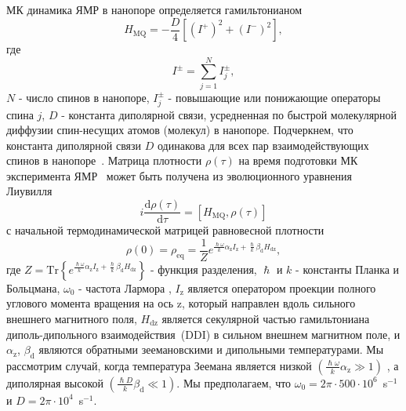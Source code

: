 \documentclass[review]{elsarticle}
\begin{document}
МК динамика ЯМР в нанопоре определяется гамильтонианом~\cite{Doronin_2019,Doronin_2009} 
%
\begin{equation}
    \label{eq:1}
    H_{\mathrm{MQ}} = - \dfrac{D}{4} \left[
        \left(I^{+}\right)^{2} 
        + \left(I^{-}\right)^{2} 
    \right] ,
\end{equation}
%
где 
%
\begin{equation}
    \label{eq:2}
    I^{\pm} = \sum\limits_{j=1}^{N} I_{j}^{\pm},
\end{equation}
%
$N$ - число спинов в нанопоре, $I^{\pm}_{j}$ - повышающие или понижающие операторы спина $j$, $D$ - константа диполярной связи, усредненная по быстрой молекулярной диффузии спин-несущих атомов (молекул) в нанопоре.
Подчеркнем, что константа диполярной связи $D$ одинакова для всех пар взаимодействующих спинов в нанопоре~\cite{Doronin_2019,Doronin_2009}.
Матрица плотности $\rho(\tau)$ на время подготовки МК эксперимента ЯМР~\cite{Baum_1985} может быть получена из эволюционного уравнения Лиувилля~\cite{Goldman_1970,Abragam_1982} 
%
\begin{equation}
    \label{eq:3}
    i\dfrac{\mathrm{d}\rho(\tau)}{\mathrm{d}\tau} = \left[
    H_\mathrm{MQ},\rho(\tau)
    \right]
\end{equation}
%
с начальной термодинамической матрицей равновесной плотности
%
\begin{equation}
    \label{eq:4}
       \rho(0) = \rho_\mathrm{eq} = \dfrac{1}{Z}
       e^{
            \frac{\hslash \omega}{k} \alpha_\mathrm{z} I_\mathrm{z} 
            + \frac{\hslash }{k} \beta_\mathrm{d} H_\mathrm{dz}
        },
\end{equation}
%
где 
$Z = \mathrm{Tr} \left\{ e^{\frac{\hslash \omega}{k} \alpha_\mathrm{z} I_\mathrm{z} + \frac{\hslash  }{k} \beta_\mathrm{d} H_\mathrm{dz}} \right\}$ - функция разделения, 
$\hslash$ и $k$ - константы Планка и Больцмана, 
$\omega_{0}$ - частота Лармора , $I_\mathrm{z}$ является оператором проекции полного углового момента вращения на ось z, 
который направлен вдоль сильного внешнего магнитного поля,  
$H_\mathrm{dz}$ является секулярной частью гамильтониана диполь-дипольного взаимодействия~(DDI) в сильном внешнем магнитном поле, и $\alpha_\mathrm{z}$, $\beta_\mathrm{d}$ являются обратными зеемановскими и дипольными температурами.
Мы рассмотрим случай, когда температура Зеемана является низкой $({\frac{\hslash \omega}{k} \alpha_\mathrm{z}}\gg 1)$ 
, а диполярная высокой $\left( \frac{\hslash{D}}{k}\beta_\mathrm{d} \ll 1\right)$.
Мы предполагаем, что $\omega_{0} = 2\pi \cdot 500 \cdot 10^{6}$~s$^{-1}$ и $D = 2\pi \cdot 10^{4}$~s$^{-1}$.
\end{document}
